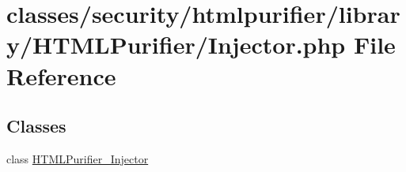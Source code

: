 \hypertarget{Injector_8php}{\section{classes/security/htmlpurifier/library/\+H\+T\+M\+L\+Purifier/\+Injector.php File Reference}
\label{Injector_8php}
}
\subsection*{Classes}
\begin{DoxyCompactItemize}
\item 
class \hyperlink{classHTMLPurifier__Injector}{H\+T\+M\+L\+Purifier\+\_\+\+Injector}
\end{DoxyCompactItemize}
